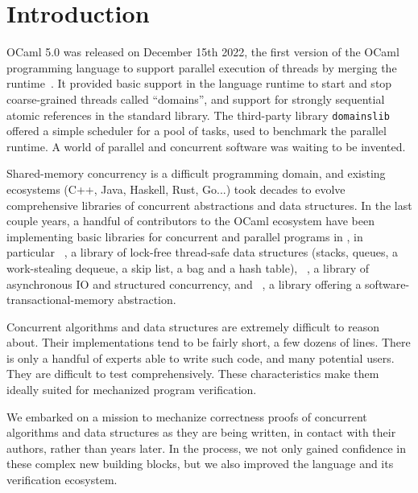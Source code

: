 \section{Introduction}
\label{sec:introduction}

OCaml 5.0 was released on December 15th 2022, the first version of the
OCaml programming language to support parallel execution of \OCaml
threads by merging the \MulticoreOCaml
runtime~\citep*{multicore-ocaml}. It provided basic support in the
language runtime to start and stop coarse-grained threads called
``domains'', and support for strongly sequential atomic references in
the standard library. The third-party library \texttt{domainslib}
offered a simple scheduler for a pool of tasks, used to benchmark the
parallel runtime. A world of parallel and concurrent software was
waiting to be invented.

Shared-memory concurrency is a difficult programming domain, and
existing ecosystems (C++, Java, Haskell, Rust, Go...) took decades to
evolve comprehensive libraries of concurrent abstractions and data
structures. In the last couple years, a handful of contributors to the
OCaml ecosystem have been implementing basic libraries for concurrent and
parallel programs in \OCaml, in particular \Saturn~\citep*{saturn},
a library of lock-free thread-safe data structures (stacks, queues,
a work-stealing dequeue, a skip list, a bag and a hash table),
\Eio~\citep*{eio}, a library of asynchronous IO and structured
concurrency, and \Kcas~\citep*{kcas}, a library offering
a software-transactional-memory abstraction.

Concurrent algorithms and data structures are extremely difficult to
reason about. Their implementations tend to be fairly short, a few
dozens of lines. There is only a handful of experts able to write such
code, and many potential users. They are difficult to test
comprehensively. These characteristics make them ideally suited for
mechanized program verification.

We embarked on a mission to mechanize correctness proofs of \OCaml
concurrent algorithms and data structures as they are being written,
in contact with their authors, rather than years later. In the
process, we not only gained confidence in these complex new building
blocks, but we also improved the \OCaml language and its verification
ecosystem.

